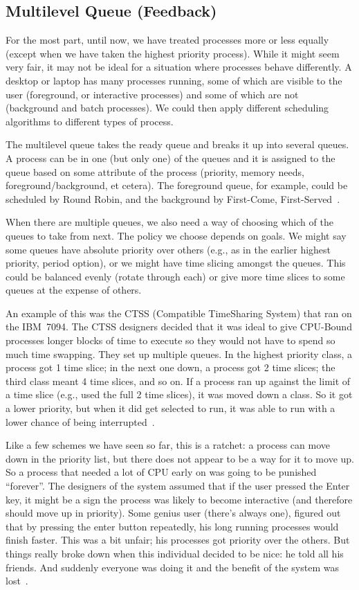 \subsection*{Multilevel Queue (Feedback)}
For the most part, until now, we have treated processes more or less equally (except when we have taken the highest priority process). While it might seem very fair, it may not be ideal for a situation where processes behave differently. A desktop or laptop has many processes running, some of which are visible to the user (foreground, or interactive processes) and some of which are not (background and batch processes). We could then apply different scheduling algorithms to different types of process.

The multilevel queue takes the ready queue and breaks it up into several queues. A process can be in one (but only one) of the queues and it is assigned to the queue based on some attribute of the process (priority, memory needs, foreground/background, et cetera). The foreground queue, for example, could be scheduled by Round Robin, and the background by First-Come, First-Served~\cite{osc}.

When there are multiple queues, we also need a way of choosing which of the queues to take from next. The policy we choose depends on goals. We might say some queues have absolute priority over others (e.g., as in the earlier highest priority, period option), or we might have time slicing amongst the queues. This could be balanced evenly (rotate through each) or give more time slices to some queues at the expense of others.

An example of this was the CTSS (Compatible TimeSharing System) that ran on the IBM~7094. The CTSS designers decided that it was ideal to give CPU-Bound processes longer blocks of time to execute so they would not have to spend so much time swapping. They set up multiple queues. In the highest priority class, a process got 1 time slice; in the next one down, a process got 2 time slices; the third class meant 4 time slices, and so on. If a process ran up against the limit of a time slice (e.g., used the full 2 time slices), it was moved down a class. So it got a lower priority, but when it did get selected to run, it was able to run with a lower chance of being interrupted~\cite{mos}.

Like a few schemes we have seen so far, this is a ratchet: a process can move down in the priority list, but there does not appear to be a way for it to move up. So a process that needed a lot of CPU early on was going to be punished ``forever''. The designers of the system assumed that if the user pressed the Enter key, it might be a sign the process was likely to become interactive (and therefore should move up in priority). Some genius user (there's always one), figured out that by pressing the enter button repeatedly, his long running processes would finish faster. This was a bit unfair; his processes got priority over the others. But things really broke down when this individual decided to be nice: he told all his friends. And suddenly everyone was doing it and the benefit of the system was lost~\cite{mos}.

